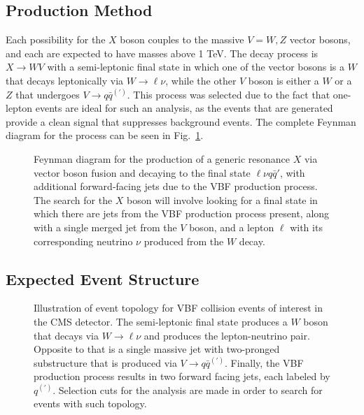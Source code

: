 \subsection{Production Method}
Each possibility for the $X$ boson couples to the massive $V=W,Z$ vector bosons, and each are expected to have masses above 1 TeV.
The decay process is $X\to WV$ with a semi-leptonic final state in which one of the vector bosons is a $W$ that decays leptonically via $W\to\ell\nu$, while the other $V$ boson is either a $W$ or a $Z$ that undergoes $V\to q\bar{q}^{(\prime)}$.
This process was selected due to the fact that one-lepton events are ideal for such an analysis, as the events that are generated provide a clean signal that suppresses background events.
The complete Feynman diagram for the process can be seen in Fig.~\ref{fig:vbfFeynman}.

\begin{figure}[htbp]
  \centering
  
  \caption{Feynman diagram for the production of a generic resonance $X$ via vector boson fusion and decaying to the final state $\ell\nu q\bar{q}'$, with additional forward-facing jets due to the VBF production process. The search for the $X$ boson will involve looking for a final state in which there are jets from the VBF production process present, along with a single merged jet from the $V$ boson, and a lepton $\ell$ with its corresponding neutrino $\nu$ produced from the $W$ decay.}
  \label{fig:vbfFeynman}
\end{figure}

\subsection{Expected Event Structure}

\begin{figure}[htbp]
  \centering
  
  \caption{Illustration of event topology for VBF collision events of interest in the CMS detector. The semi-leptonic final state produces a $W$ boson that decays via $W\to\ell\nu$ and produces the lepton-neutrino pair. Opposite to that is a single massive jet with two-pronged substructure that is produced via $V\to q\bar{q}^{(\prime)}$. Finally, the VBF production process results in two forward facing jets, each labeled by $q^{(\prime)}$. Selection cuts for the analysis are made in order to search for events with such topology.}
  \label{fig:eventTop}
\end{figure}
